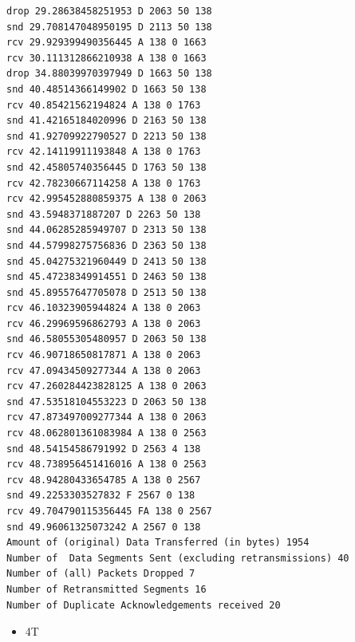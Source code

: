\documentclass[11pt]{article}
\begin{document}
\begin{verbatim}
drop 29.28638458251953 D 2063 50 138
snd 29.708147048950195 D 2113 50 138
rcv 29.929399490356445 A 138 0 1663
rcv 30.111312866210938 A 138 0 1663
drop 34.88039970397949 D 1663 50 138
snd 40.48514366149902 D 1663 50 138
rcv 40.85421562194824 A 138 0 1763
snd 41.42165184020996 D 2163 50 138
snd 41.92709922790527 D 2213 50 138
rcv 42.14119911193848 A 138 0 1763
snd 42.45805740356445 D 1763 50 138
rcv 42.78230667114258 A 138 0 1763
rcv 42.995452880859375 A 138 0 2063
snd 43.5948371887207 D 2263 50 138
snd 44.06285285949707 D 2313 50 138
snd 44.57998275756836 D 2363 50 138
snd 45.04275321960449 D 2413 50 138
snd 45.47238349914551 D 2463 50 138
snd 45.89557647705078 D 2513 50 138
rcv 46.10323905944824 A 138 0 2063
rcv 46.29969596862793 A 138 0 2063
snd 46.58055305480957 D 2063 50 138
rcv 46.90718650817871 A 138 0 2063
rcv 47.09434509277344 A 138 0 2063
rcv 47.260284423828125 A 138 0 2063
snd 47.53518104553223 D 2063 50 138
rcv 47.873497009277344 A 138 0 2063
rcv 48.062801361083984 A 138 0 2563
snd 48.54154586791992 D 2563 4 138
rcv 48.738956451416016 A 138 0 2563
rcv 48.94280433654785 A 138 0 2567
snd 49.2253303527832 F 2567 0 138
rcv 49.704790115356445 FA 138 0 2567
snd 49.96061325073242 A 2567 0 138
Amount of (original) Data Transferred (in bytes) 1954
Number of  Data Segments Sent (excluding retransmissions) 40
Number of (all) Packets Dropped 7
Number of Retransmitted Segments 16
Number of Duplicate Acknowledgements received 20
\end{verbatim}
\begin{itemize}
\item 4T
\end{itemize}
\end{document}
